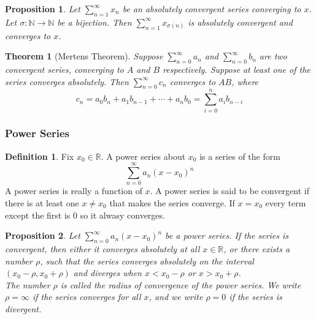 \documentclass{article}
\newtheorem{theorem}{Theorem}[section]
\newtheorem{proposition}{Proposition}[section]
\theoremstyle{definition}
\newtheorem{definition}{Definition}[section]
\theoremstyle{remark}
\begin{document}
\begin{proposition}
Let $\sum^\infty_{n=1}{x_n}$ be an absolutely convergent series converging to $x$. 
Let $\sigma: \mathbb{N}\to \mathbb{N}$ be a bijection. Then 
$\sum^\infty_{n=1}{x_{\sigma(n)}}$ is absolutely convergent and converges to $x$.
\end{proposition}


\begin{theorem}[Mertens Theorem]
Suppose $\sum^\infty_{n=0}{a_n}$ and $\sum^\infty_{n=0}{b_n}$
are two convergent series, converging to $A$ and $B$ respectively. Suppose at 
least one of the series converges absolutely. Then $\sum^\infty_{n=0}{c_n}$ converges
to $AB$, where 
\[
c_n = a_0b_n + a_1b_{n-1} + \cdots + a_nb_0 = \sum^n_{i=0}{a_ib_{n-i}}
\]

\end{theorem}


\subsubsection{Power Series}

\begin{definition}
Fix $x_0 \in \mathbb{R}$. A power series about $x_0$ is a series of the form
\[
\sum_{n=0}^{\infty}{a_n(x-x_0)^n}
\]
A power series is really a function of $x$. A power
series is said to be convergent if there is at least one $x \neq x_0$ that
makes the series converge. If $x = x_0$ every term except the first is 0 so it alwasy converges. 
\end{definition}




\begin{proposition}
Let $\sum_{n=0}^{\infty} a_n (x - x_0)^n$ be a power series. 
If the series is convergent, then either it converges absolutely at all $x \in \mathbb{R}$, or there exists a 
number $\rho$, such that the series converges absolutely on the interval $(x_0 - \rho, x_0 + \rho)$ and diverges 
when $x < x_0 - \rho$ or $x > x_0 + \rho$. \\
\indent The number $\rho$ is called the \textit{radius of convergence} of the power series. We 
write $\rho = \infty$ if the series converges for all $x$, and we write $\rho = 0$ if the series is divergent. 
\end{proposition}
\end{document}

